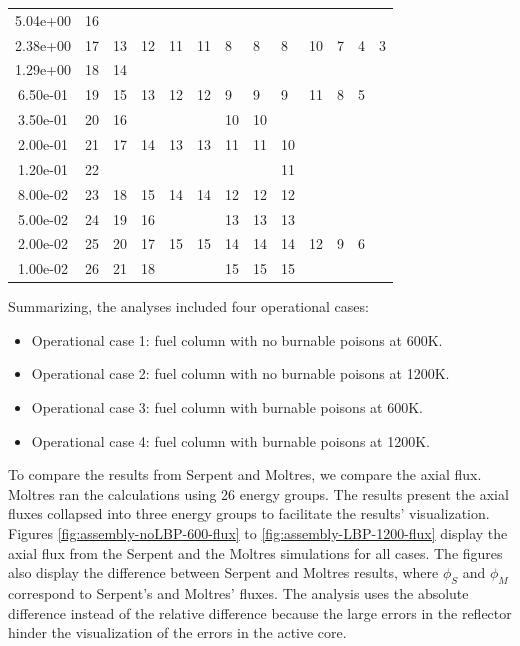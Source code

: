 \begin{table}[htbp!]
\begin{tabular}{S[table-format=2.2e-1]|llllllllllll}
  5.04e+00            & 16    &      &      &     &     &     &     &       &     &    &    &   \\ 
  2.38e+00            & 17    & 13   & 12   & 11  & 11  & 8   & 8   & 8     & 10  & 7  & 4  & 3 \\ 
  1.29e+00            & 18    & 14   &      &     &     &     &     &       &     &    &    &   \\ 
  6.50e-01            & 19    & 15   & 13   & 12  & 12  & 9   & 9   & 9     & 11  & 8  & 5  &   \\ 
  3.50e-01            & 20    & 16   &      &     &     & 10  & 10  &       &     &    &    &   \\ 
  2.00e-01            & 21    & 17   & 14   & 13  & 13  & 11  & 11  & 10    &     &    &    &   \\ 
  1.20e-01            & 22    &      &      &     &     &     &     & 11    &     &    &    &   \\ 
  8.00e-02            & 23    & 18   & 15   & 14  & 14  & 12  & 12  & 12    &     &    &    &   \\ 
  5.00e-02            & 24    & 19   & 16   &     &     & 13  & 13  & 13    &     &    &    &   \\ 
  2.00e-02            & 25    & 20   & 17   & 15  & 15  & 14  & 14  & 14    & 12  & 9  & 6  &   \\ 
  1.00e-02            & 26    & 21   & 18   &     &     & 15  & 15  & 15    &     &    &    &   \\ 
  \bottomrule
  \end{tabular}
  \label{tab:energygroups}
\end{table}

Summarizing, the analyses included four operational cases: 
\begin{itemize}
  \item Operational case 1: fuel column with no burnable poisons at 600K.
  \item Operational case 2: fuel column with no burnable poisons at 1200K.
  \item Operational case 3: fuel column with burnable poisons at 600K.
  \item Operational case 4: fuel column with burnable poisons at 1200K.
\end{itemize}

To compare the results from Serpent and Moltres, we compare the axial flux.
Moltres ran the calculations using 26 energy groups.
The results present the axial fluxes collapsed into three energy groups to facilitate the results' visualization.
Figures \ref{fig:assembly-noLBP-600-flux} to \ref{fig:assembly-LBP-1200-flux} display the axial flux from the Serpent and the Moltres simulations for all cases.
The figures also display the difference between Serpent and Moltres results, where $\phi_S$ and $\phi_M$ correspond to Serpent's and Moltres' fluxes.
The analysis uses the absolute difference instead of the relative difference because the large errors in the reflector hinder the visualization of the errors in the active core.

